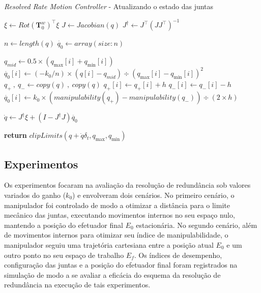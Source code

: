 \begin{algorithm}
    \caption{\emph{Resolved Rate Motion Controller} {-} Atualizando o estado das juntas}\label{rrc-alg}
    \begin{algorithmic}[1]
        \State$\xi \gets {Rot(\mathbf{T}^w_0)}^\top \xi$
        \State$J \gets Jacobian(q)$
        \State$J^\dag \gets J^\top {(J J^\top)}^{-1}$

        \State$n \gets length(q)$
        \State$\dot{q_0} \gets array(size: n)$

         
        \State$q_{mid} \gets 0.5 \times (q_{\max}[i] + q_{\min}[i])$
        \State$\dot{q_0}[i] \gets (-k_0 / n) \times (q[i] - q_{mid}) \div {{(q_{\max}[i] - q_{\min}[i])}^2}$
        \State$q_{+} \ , \ q_{-} \gets copy(q) \ , \ copy(q)$
        \State$q_{+}[i] \gets q_{+}[i] + h$
        \State$q_{-}[i] \gets q_{-}[i] - h$
        \State$\dot{q_0}[i] \gets k_0 \times (manipulability(q_{+}) - manipulability(q_{-})) \div (2 \times h)$
        \EndIf{}
        \EndFor{}

        \State$\dot{q} \gets J^\dag \xi + (I - J^\dag J) \dot{q_0}$

        \State\textbf{return} $clipLimits(q + \dot{q} \delta_t, q_{\max}, q_{\min})$ 
        \EndProcedure\end{algorithmic}
\end{algorithm}

\subsection*{Experimentos}

Os experimentos focaram na avaliação da resolução de redundância
sob valores variados do ganho (\(k_0\)) e envolveram dois cenários. No primeiro
cenário, o manipulador foi controlado de modo a otimizar a distância para o limite mecânico das juntas, 
executando movimentos internos no seu espaço nulo, mantendo a posição do efetuador final \(E_0\) estacionária.
No segundo cenário, além de movimentos internos para otimizar seu índice de manipulabilidade, o manipulador 
seguiu uma trajetória cartesiana entre a posição atual \(E_0\) e um outro ponto no seu espaço 
de trabalho \(E_f\). Os índices de desempenho, configuração das juntas e a 
posição do efetuador final foram registrados na simulação de modo a se avaliar 
a eficácia do esquema da resolução de redundância na execução de tais experimentos.

